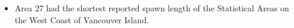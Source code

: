 \begin{itemize}
\item Area 27 had the shortest reported spawn length of the Statistical Areas on the West Coast of Vancouver Island.
\end{itemize}